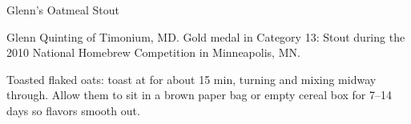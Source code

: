 \begin{recipe}{Glenn's Oatmeal Stout} %

\begin{aboutblock}
Glenn Quinting of Timonium, MD. Gold medal in Category 13: Stout during the
2010 National Homebrew Competition in Minneapolis, MN. \sourceaha
\end{aboutblock}


\begin{methodandtiming}

\begin{mashsteps}
\end{mashsteps}

\begin{fermentationsteps}
\end{fermentationsteps}

\begin{directions}
Toasted flaked oats: toast at  for about 15 min, turning and mixing
midway through. Allow them to sit in a brown paper bag or empty cereal box
for 7--14 days so flavors smooth out. 
\end{directions}

\end{methodandtiming}

\recipebreak

\begin{ingredientsblock}

\begin{malts}
\end{malts}

\begin{hops}
\end{hops}


\end{ingredientsblock}

\end{recipe}

